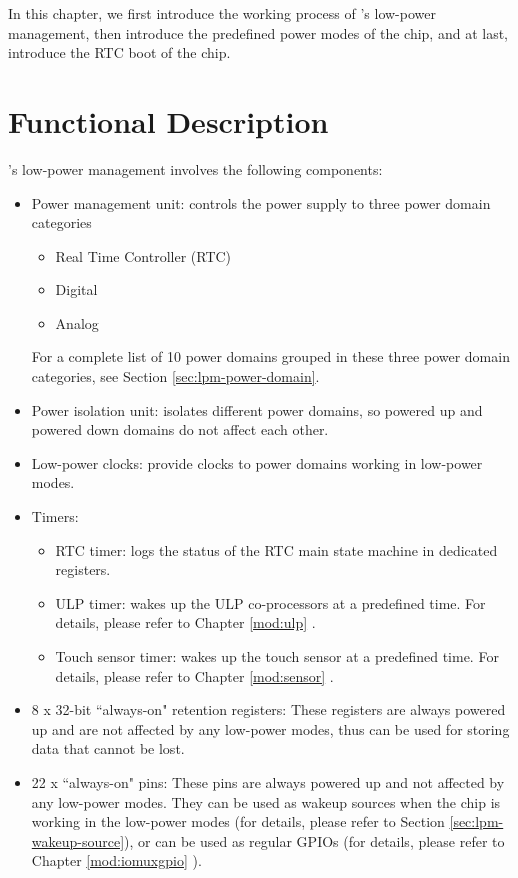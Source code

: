 \documentclass[main\_\_EN.tex]{subfiles}
\begin{document}
In this chapter, we first introduce the working process of \chipname{}'s low-power management, then introduce the predefined power modes of the chip, and at last, introduce the RTC boot of the chip.

\section{Functional Description}

\chipname{}'s low-power management involves the following components:

\begin{itemize}
    \item Power management unit: controls the power supply to three power domain categories
    \begin{itemize}
        \item Real Time Controller (RTC)
        \item Digital
        \item Analog
    \end{itemize}
    For a complete list of 10 power domains grouped in these three power domain categories, see Section \ref{sec:lpm-power-domain}.
    \item Power isolation unit: isolates different power domains, so powered up and powered down domains do not affect each other.
    \item Low-power clocks: provide clocks to power domains working in low-power modes.
    \item Timers:
    \begin{itemize}
        \item RTC timer: logs the status of the RTC main state machine in dedicated registers.
        \item ULP timer: wakes up the ULP co-processors at a predefined time. For details, please refer to Chapter \ref{mod:ulp} \textit{}.
        \item Touch sensor timer: wakes up the touch sensor at a predefined time. For details, please refer to Chapter \ref{mod:sensor} \textit{}.
    \end{itemize}
    \item 8 x 32-bit ``always-on" retention registers: These registers are always powered up and are not affected by any low-power modes, thus can be used for storing data that cannot be lost.
    \item 22 x ``always-on" pins: These pins are always powered up and not affected by any low-power modes. They can be used as wakeup sources when the chip is working in the low-power modes (for details, please refer to Section \ref{sec:lpm-wakeup-source}), or can be used as regular GPIOs (for details, please refer to Chapter \ref{mod:iomuxgpio} \textit{}).

\end{itemize}
\end{document}
